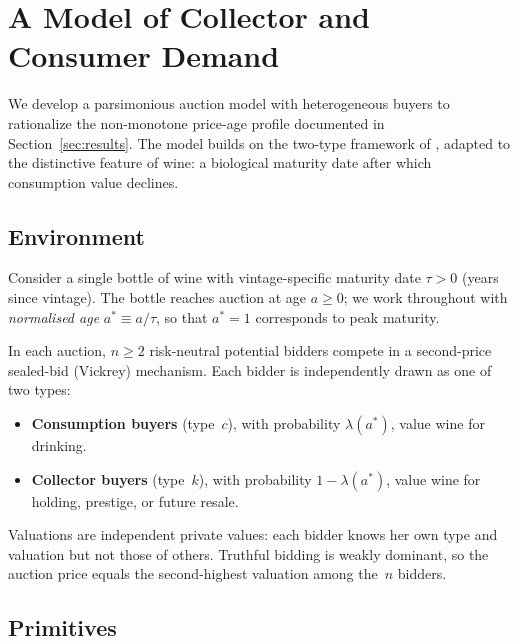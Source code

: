 
\section{A Model of Collector and Consumer Demand}
\label{sec:model}

We develop a parsimonious auction model with heterogeneous buyers to
rationalize the non-monotone price-age profile documented in
Section~\ref{sec:results}.  The model builds on the two-type framework
of \citet{lovo2018}, adapted to the distinctive feature of wine:
a biological maturity date after which consumption value declines.


\subsection{Environment}
\label{sec:model:env}

Consider a single bottle of wine with vintage-specific maturity date
$\tau > 0$ (years since vintage).  The bottle reaches auction at age
$a \geq 0$; we work throughout with \emph{normalised age}
$a^{*} \equiv a / \tau$, so that $a^{*} = 1$ corresponds to peak
maturity.

In each auction, $n \geq 2$ risk-neutral potential bidders compete in a
second-price sealed-bid (Vickrey) mechanism.  Each bidder is
independently drawn as one of two types:
\begin{itemize}
  \item \textbf{Consumption buyers} (type~$c$), with probability
        $\lambda(a^{*})$, value wine for drinking.
  \item \textbf{Collector buyers} (type~$k$), with probability
        $1 - \lambda(a^{*})$, value wine for holding, prestige, or
        future resale.
\end{itemize}
Valuations are independent private values: each bidder knows her own
type and valuation but not those of others.  Truthful bidding is
weakly dominant, so the auction price equals the second-highest
valuation among the~$n$ bidders.


\subsection{Primitives}
\label{sec:model:primitives}

